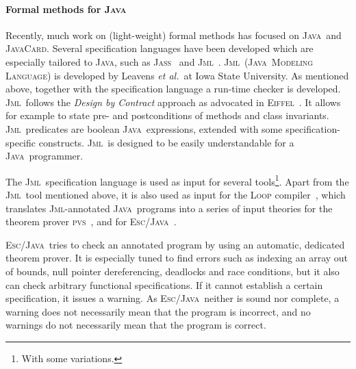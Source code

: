 \documentclass[a4paper]{llncs}
\newcommand{\jml}{\textsc{Jml}}
\newcommand{\escj}{\textsc{Esc/Java}}
\newcommand{\eiffel}{\textsc{Eiffel}}
\newcommand{\jass}{\textsc{Jass}}
\newcommand{\java}{\textsc{Java}}
\newcommand{\cPP}{\textsc{C/C}\nolinebreak\hspace{-.05em}\raisebox{.4ex}{\tiny\bf
+}\nolinebreak\hspace{-.10em}\raisebox{.4ex}{\tiny\bf +}}
\begin{document}
\paragraph{\bf{Formal methods for \java}}
Recently, much work on (light-weight) formal methods has focused on
\java\ and \textsc{JavaCard}. Several specification languages have
been developed which are especially tailored to \java, such as
\jass~\cite{bartetzko01assertions} and \jml~\cite{LeavensBR00}.
\jml\ (\java\ \textsc{Modeling} \textsc{Language}) is developed 
by Leavens \emph{et al.}~at Iowa State University. As mentioned above,
together with the specification language a run-time checker is
developed. \jml\ follows the \emph{Design by Contract} approach as
advocated in
\eiffel~\cite{Meyer97}. It allows for example to state pre- and
postconditions of methods and class invariants. \jml\ predicates are
boolean \java\ expressions, extended with some specification-specific
constructs. \jml\ is designed to be easily understandable for a \java\
programmer.

The \jml\ specification language is used as input for several
tools\footnote{With some variations.}. Apart from the \jml\ tool
mentioned above, it is also used as input for the \textsc{Loop}
compiler~\cite{LoopURL,BergJ01}, which translates
\jml-annotated \java\ programs into a series of input theories for the 
theorem prover \textsc{pvs}~\cite{OwreRRSS96}, and for
\escj~\cite{LeinoNS00,EscJmlDiff}. 

\escj\ tries to check an annotated program by
using an automatic, dedicated theorem prover. It is especially tuned
to find errors such as indexing an array out of bounds, null pointer
dereferencing, deadlocks and race conditions, but it also can check
arbitrary functional specifications. If it cannot establish a certain
specification, it issues a warning. As \escj\ neither is sound nor
complete, a warning does not necessarily mean that the program is
incorrect, and no warnings do not necessarily mean that the program is
correct.

\end{document}
